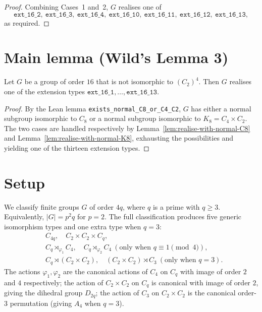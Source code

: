 \begin{proof}
  \smallskip
  Combining Cases~1 and~2, $G$ realises one of
  \[
    \mathtt{ext\_16\_2},\ \mathtt{ext\_16\_3},\ \mathtt{ext\_16\_4},\
    \mathtt{ext\_16\_10},\ \mathtt{ext\_16\_11},\ \mathtt{ext\_16\_12},\
    \mathtt{ext\_16\_13},
  \]
  as required.
\end{proof}

\section{Main lemma (Wild's Lemma 3)}

\begin{theorem}
  \label{thm:realise-ext-type-if-not-iso-to-C2-4}
  Let $G$ be a group of order $16$ that is not isomorphic to $(C_2)^4$. Then
  $G$ realises one of the extension types $\mathtt{ext\_16\_1}, \dots,
  \mathtt{ext\_16\_13}$.
\end{theorem}

\begin{proof}
  By the Lean lemma \texttt{exists\_normal\_C8\_or\_C4\_C2}, $G$ has either a
  normal subgroup isomorphic to $C_8$ or a normal subgroup isomorphic to
  $K_8 = C_4 \times C_2$. The two cases are handled respectively by
  Lemma~\ref{lem:realise-with-normal-C8} and
  Lemma~\ref{lem:realise-with-normal-K8}, exhausting the possibilities and
  yielding one of the thirteen extension types.
\end{proof}







\section{Setup}

We classify finite groups $G$ of order $4q$, where $q$ is a prime with $q \geq
3$. Equivalently, $|G| = p^2 q$ for $p = 2$. The full classification produces
five generic isomorphism types and one extra type when $q = 3$:
\[
\begin{aligned}
& C_{4q}, \quad C_2 \times C_2 \times C_q, \\
& C_q \rtimes_{\varphi_1} C_4, \quad
  C_q \rtimes_{\varphi_2} C_4 \ (\text{only when } q \equiv 1 \pmod 4), \\
& C_q \rtimes (C_2 \times C_2), \quad
  (C_2 \times C_2) \rtimes C_3 \ (\text{only when } q = 3).
\end{aligned}
\]
The actions $\varphi_1, \varphi_2$ are the canonical actions of $C_4$ on $C_q$
with image of order $2$ and $4$ respectively; the action of $C_2 \times C_2$ on
$C_q$ is canonical with image of order $2$, giving the dihedral group
$D_{2q}$; the action of $C_3$ on $C_2 \times C_2$ is the canonical order-$3$
permutation (giving $A_4$ when $q = 3$).

